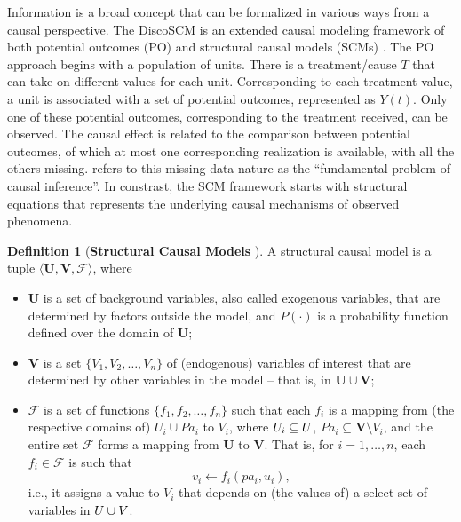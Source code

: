 \documentclass[letterpaper]{article} %
\theoremstyle{definition}
\newtheorem{definition}[theorem]{Definition}
\theoremstyle{remark}
\begin{document}
Information is a broad concept that can be formalized in various ways from a causal perspective. 
The DiscoSCM \cite{gong2024distribution} is an extended causal modeling framework of both potential outcomes (PO) \cite{rubin1974estimating, neyman1923application} and structural causal models (SCMs) \cite{pearl2009causality}. The PO approach begins with a population of units. There is a treatment/cause $T$ that can take on different values for each unit. Corresponding to each treatment value, a unit is associated with a set of potential outcomes, represented as $Y(t)$. Only one of these potential outcomes, corresponding to the treatment received,  can be observed. The causal effect is related to the comparison between potential outcomes, of which at most one corresponding realization is available, with all the others missing. \cite{holland1986statistics} refers to this missing data nature as the ``fundamental problem of causal inference''. In constrast, the SCM framework starts with structural equations that represents the underlying causal mechanisms of observed phenomena.
\begin{definition}[\textbf{Structural Causal Models} \cite{pearl2009causality}]
    \label{def:scm} 
    A structural causal model is a tuple $\langle \mathbf{U}, \mathbf{V}, \mathcal{F}\rangle$, where 
    \begin{itemize}
        \item $\mathbf{U}$ is a set of background variables, also called exogenous variables, that are determined by factors outside the model, and $P(\cdot)$ is a probability function defined over the domain of $\mathbf{U}$; 
        \item $\mathbf{V}$ is a set $\{V_1, V_2, \ldots, V_n\}$ of (endogenous) variables of interest that are determined by other variables in the model -- that is, in $\mathbf{U} \cup \mathbf{V}$;
        \item $\mathcal{F}$ is a set of functions $\{f_1, f_2, \ldots, f_n\}$ such that each $f_i$ is a mapping from (the respective domains of) $U_{i} \cup Pa_{i}$ to $V_{i}$, where $U_{i} \subseteq \*{U}$, $Pa_{i} \subseteq \mathbf{V} \setminus V_{i}$, and the entire set $\mathcal{F}$ forms a mapping from $\mathbf{U}$ to $\mathbf{V}$. That is, for $i=1,\ldots,n$, each $f_i \in \mathcal{F}$ is such that 
        $$v_i \leftarrow f_{i}(pa_{i}, u_{i}),$$ 
        i.e., it assigns a value to $V_i$ that depends on (the values of) a select set of variables in $\*U \cup \*V$.
    \end{itemize}
\end{definition}
\end{document}
